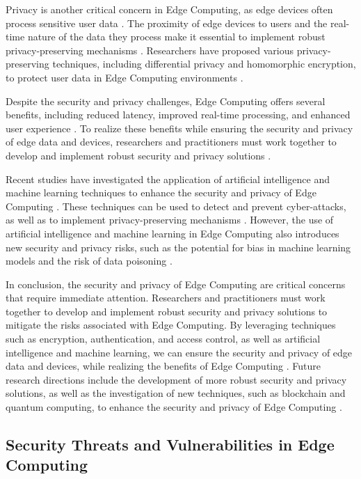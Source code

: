 \documentclass[11pt,a4paper]{article}
\begin{document}
Privacy is another critical concern in Edge Computing, as edge devices often process sensitive user data \cite{arxiv:1909.00560}. The proximity of edge devices to users and the real-time nature of the data they process make it essential to implement robust privacy-preserving mechanisms \cite{arxiv:1911.02794}. Researchers have proposed various privacy-preserving techniques, including differential privacy and homomorphic encryption, to protect user data in Edge Computing environments \cite{arxiv:2111.10076}.

Despite the security and privacy challenges, Edge Computing offers several benefits, including reduced latency, improved real-time processing, and enhanced user experience \cite{arxiv:1710.11001}. To realize these benefits while ensuring the security and privacy of edge data and devices, researchers and practitioners must work together to develop and implement robust security and privacy solutions \cite{arxiv:1906.08452}.

Recent studies have investigated the application of artificial intelligence and machine learning techniques to enhance the security and privacy of Edge Computing \cite{arxiv:1907.08349}. These techniques can be used to detect and prevent cyber-attacks, as well as to implement privacy-preserving mechanisms \cite{arxiv:1905.10083}. However, the use of artificial intelligence and machine learning in Edge Computing also introduces new security and privacy risks, such as the potential for bias in machine learning models and the risk of data poisoning \cite{arxiv:1911.02794}.

In conclusion, the security and privacy of Edge Computing are critical concerns that require immediate attention. Researchers and practitioners must work together to develop and implement robust security and privacy solutions to mitigate the risks associated with Edge Computing. By leveraging techniques such as encryption, authentication, and access control, as well as artificial intelligence and machine learning, we can ensure the security and privacy of edge data and devices, while realizing the benefits of Edge Computing \cite{arxiv:2206.07164}. Future research directions include the development of more robust security and privacy solutions, as well as the investigation of new techniques, such as blockchain and quantum computing, to enhance the security and privacy of Edge Computing \cite{arxiv:2004.14850}.


\subsection{Security Threats and Vulnerabilities in Edge Computing}
\end{document}
